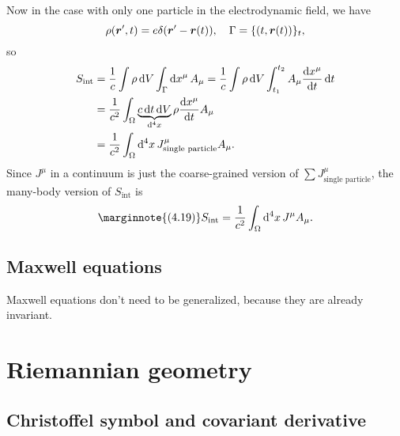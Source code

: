 \documentclass[hyperref, a4paper]{article}
\begin{document}
Now in the case with only one particle in the electrodynamic field, we have 
\[
    \rho(\vb*{r}', t) = e \delta(\vb*{r}' - \vb*{r}(t)), \quad \Gamma = \{ (t, \vb*{r}(t)) \}_t,
\]
so
\[
    \begin{aligned}
        S_\text{int} &= \frac{1}{c} \int \rho \dd{V}  \int_\Gamma \dd{x^\mu} A_\mu = \frac{1}{c} \int \rho \dd{V} \int_{t_1}^{t_2} A_\mu \dv{x^\mu}{t} \dd{t} \\
        &= \frac{1}{c^2} \int_\Omega \underbrace{c \dd{t} \dd{V}}_{\dd[4]{x}} \rho \dv{x^\mu}{t} A_\mu \\
        &= \frac{1}{c^2} \int_\Omega \dd[4]{x} J_\text{single particle}^\mu A_\mu .
    \end{aligned}
\]
Since $J^\mu$ in a continuum is just the coarse-grained version of $\sum J^\mu_\text{single particle}$,
the many-body version of $S_\text{int}$ is 
\begin{equation} \marginnote{(4.19)}
    S_\text{int} = \frac{1}{c^2} \int_\Omega \dd[4]{x} J^\mu A_\mu.
\end{equation}

\subsection{Maxwell equations}

Maxwell equations don't need to be generalized, because they are already invariant.

\section{Riemannian geometry}

\subsection{Christoffel symbol and covariant derivative}
\end{document}
